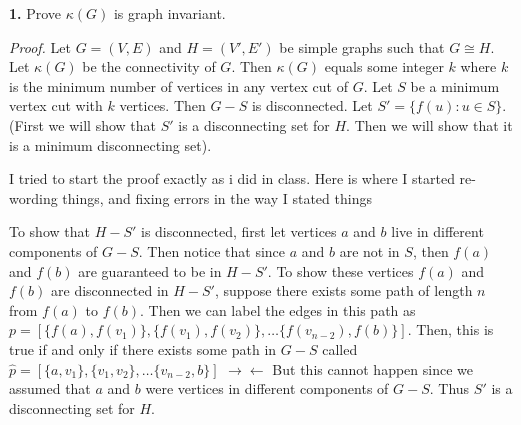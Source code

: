 \documentclass{article}
\begin{document}
\setlength{\parindent}{0cm}   %






\textbf{1.} Prove \(\kappa(G)\) is graph invariant. 

\vspace{3mm}

\textit{Proof.} Let \(G=(V,E)\) and \(H=(V',E')\) be simple graphs such that \(G \cong H\). Let \(\kappa(G)\) be the connectivity of \(G\). Then \(\kappa(G)\) equals some integer \(k\) where \(k\) is the minimum number of vertices in any vertex cut of \(G\). Let \(S\) be a minimum vertex cut with \(k\) vertices. Then \(G-S\) is disconnected. Let \( S' = \{ f(u) : u \in S\}\). (First we will show that \(S'\) is a disconnecting set for \(H\). Then we will show that it is a minimum disconnecting set). 


\vspace{3mm}
{\color{red}  I tried to start the proof exactly as i did in class. Here is where I started re-wording things, and fixing errors in the way I stated things }
\vspace{3mm}


To show that \(H-S'\) is disconnected, first let vertices \(a\) and \(b\) live in different components of \(G-S\). Then notice that since \(a \) and \(b\) are not in \(S\), then \(f(a) \) and \(f(b)\) are guaranteed to be in \(H-S'\). To show these vertices \(f(a) \) and \(f(b)\) are disconnected in \(H-S'\), suppose there exists some path of length \(n\) from \(f(a)\) to \(f(b)\). Then we can label the edges in this path as \(p=[ \{f(a),f(v_1)\}, \{f(v_1),f(v_2)\}, \ldots \{f(v_{n-2}),f(b)\}] \). Then, this is true if and only if there exists some path in \(G-S\) called \(\hat p = [\{a,v_1\},\{v_1,v_2\},\ldots \{v_{n-2}, b\} ] \) \(\rightarrow\!\leftarrow\) But this cannot happen since we assumed that \(a\) and \(b\) were vertices in different components of \(G-S\). Thus \(S'\) is a disconnecting set for \(H\). 
\end{document}

